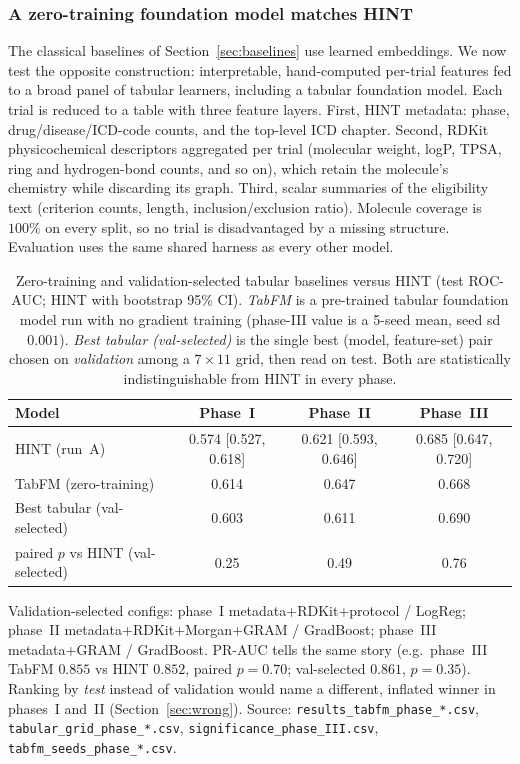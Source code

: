 \documentclass[a4paper,fleqn]{cas-sc}
\begin{document}
\subsubsection{A zero-training foundation model matches HINT}
\label{sec:tabfm}
The classical baselines of Section~\ref{sec:baselines} use learned embeddings. We now test
the opposite construction: interpretable, hand-computed per-trial features fed to a broad
panel of tabular learners, including a tabular foundation model. Each trial is reduced to a
table with three feature layers. First, HINT metadata: phase, drug/disease/ICD-code counts,
and the top-level ICD chapter. Second, RDKit physicochemical descriptors aggregated per
trial (molecular weight, logP, TPSA, ring and hydrogen-bond counts, and so on), which retain
the molecule's chemistry while discarding its graph. Third, scalar summaries of the
eligibility text (criterion counts, length, inclusion/exclusion ratio). Molecule coverage is
$100\%$ on every split, so no trial is disadvantaged by a missing structure. Evaluation uses
the same shared harness as every other model.
\begin{table}[t]
\centering
\small
\caption{Zero-training and validation-selected tabular baselines versus HINT (test ROC-AUC; HINT with bootstrap 95\% CI). \emph{TabFM} is a pre-trained tabular foundation model run with no gradient training (phase-III value is a 5-seed mean, seed sd $0.001$). \emph{Best tabular (val-selected)} is the single best (model, feature-set) pair chosen on \emph{validation} among a $7\times11$ grid, then read on test. Both are statistically indistinguishable from HINT in every phase.}
\label{tab:tabfm}
\begin{tabular}{lccc}
\toprule
Model & Phase~I & Phase~II & Phase~III \\
\midrule
HINT (run~A) & 0.574 {\scriptsize [0.527, 0.618]} & 0.621 {\scriptsize [0.593, 0.646]} & 0.685 {\scriptsize [0.647, 0.720]} \\
TabFM (zero-training) & 0.614 & 0.647 & 0.668 \\
Best tabular (val-selected) & 0.603 & 0.611 & 0.690 \\
\midrule
paired $p$ vs HINT (val-selected) & 0.25 & 0.49 & 0.76 \\
\bottomrule
\end{tabular}
\begin{minipage}{\linewidth}\vspace{2pt}\scriptsize Validation-selected configs: phase~I metadata+RDKit+protocol / LogReg; phase~II metadata+RDKit+Morgan+GRAM / GradBoost; phase~III metadata+GRAM / GradBoost. PR-AUC tells the same story (e.g.\ phase~III TabFM $0.855$ vs HINT $0.852$, paired $p=0.70$; val-selected $0.861$, $p=0.35$). Ranking by \emph{test} instead of validation would name a different, inflated winner in phases~I and~II (Section~\ref{sec:wrong}). Source: \texttt{results\_tabfm\_phase\_*.csv}, \texttt{tabular\_grid\_phase\_*.csv}, \texttt{significance\_phase\_III.csv}, \texttt{tabfm\_seeds\_phase\_*.csv}. \end{minipage}
\end{table}
\end{document}
